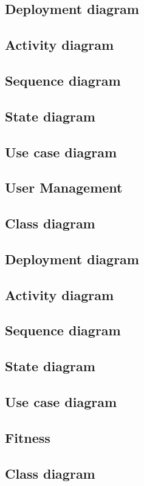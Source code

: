 \documentclass{article}
\begin{document}
		\subsection{Deployment diagram}
		\subsection{Activity diagram}
		\subsection{Sequence diagram}
		\subsection{State diagram}
		\subsection{Use case diagram}


	\clearpage
	\subsection{User Management}
		\subsection{Class diagram}
		\subsection{Deployment diagram}
		\subsection{Activity diagram}
		\subsection{Sequence diagram}
		\subsection{State diagram}
		\subsection{Use case diagram}


	\clearpage
	\subsection{Fitness}
		\subsection{Class diagram}
\end{document}
